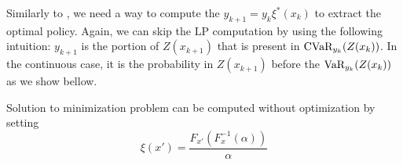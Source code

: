 Similarly to , we need a way to compute the $y_{k+1}=y_{k}\xi^*(x_k)$ to extract the optimal policy. Again, we can skip the LP computation by using the following intuition: $y_{k+1}$ is the portion of $Z(x_{k+1})$ that is present in $\text{CVaR}_{y_k}(Z(x_k))$. In the continuous case, it is the probability in $Z(x_{k+1})$ before the $\text{VaR}_{y_k}(Z(x_k))$ as we show bellow.


\begin{theorem}
Solution to minimization problem  can be computed without optimization by setting
\begin{equation}\label{eqn:xi-claim}
\xi ( x' ) = \dfrac{F_{x'}(F^{-1}_x(\alpha))}{\alpha} 
\end{equation}
\end{theorem}

